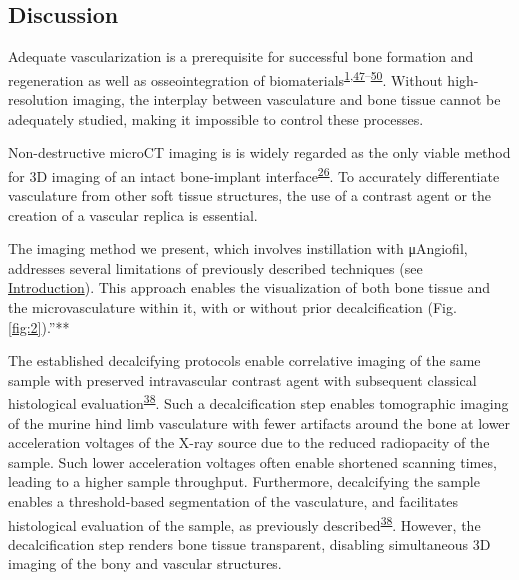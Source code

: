 \hypertarget{discussion}{%
\subsection{Discussion}\label{discussion}}

Adequate vascularization is a prerequisite for successful bone formation and regeneration as well as osseointegration of biomaterials\textsuperscript{\protect\hyperlink{ref-zXoIXG3G}{1},\protect\hyperlink{ref-lVl4gVyN}{47}--\protect\hyperlink{ref-16mB4VUpP}{50}}.
Without high-resolution imaging, the interplay between vasculature and bone tissue cannot be adequately studied, making it impossible to control these processes.

Non-destructive microCT imaging is is widely regarded as the only viable method for 3D imaging of an intact bone-implant interface\textsuperscript{\protect\hyperlink{ref-11349lK8v}{26}}.
To accurately differentiate vasculature from other soft tissue structures, the use of a contrast agent or the creation of a vascular replica is essential.

The imaging method we present, which involves instillation with μAngiofil, addresses several limitations of previously described techniques (see \protect\hyperlink{introduction}{Introduction}).
This approach enables the visualization of both bone tissue and the microvasculature within it, with or without prior decalcification (Fig. \ref{fig:2}).''**

The established decalcifying protocols enable correlative imaging of the same sample with preserved intravascular contrast agent with subsequent classical histological evaluation\textsuperscript{\protect\hyperlink{ref-iM9i6gkJ}{38}}.
Such a decalcification step enables tomographic imaging of the murine hind limb vasculature with fewer artifacts around the bone at lower acceleration voltages of the X-ray source due to the reduced radiopacity of the sample.
Such lower acceleration voltages often enable shortened scanning times, leading to a higher sample throughput.
Furthermore, decalcifying the sample enables a threshold-based segmentation of the vasculature, and facilitates histological evaluation of the sample, as previously described\textsuperscript{\protect\hyperlink{ref-iM9i6gkJ}{38}}.
However, the decalcification step renders bone tissue transparent, disabling simultaneous 3D imaging of the bony and vascular structures.

